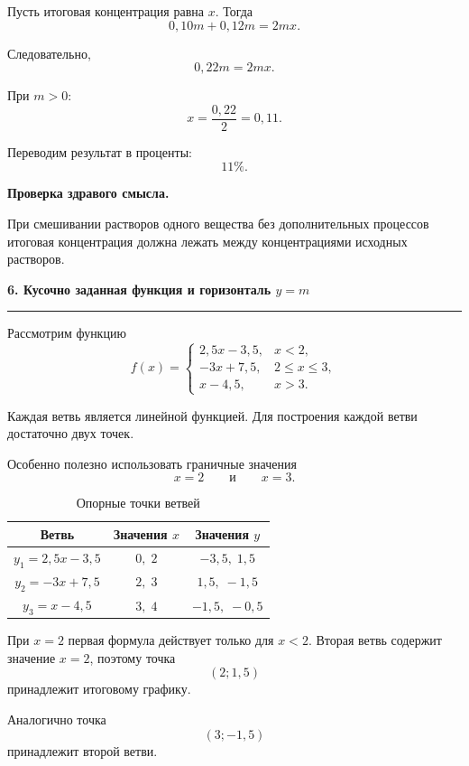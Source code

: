 \documentclass[a4paper,12pt]{article}
\newcommand{\topic}[1]{%
  \vspace{0.8em}%
  {\Large\bfseries\color{darkaccent}#1}\par
  \vspace{0.25em}%
  {\color{accent}\rule{\linewidth}{0.6pt}}\par
  \vspace{0.45em}%
}
\newcommand{\key}[1]{%
  \textbf{\color{darkaccent}#1}%
}
\begin{document}
Пусть итоговая концентрация равна \(x\). Тогда
\[
0{,}10m+0{,}12m=2mx.
\]

Следовательно,
\[
0{,}22m=2mx.
\]

При \(m>0\):
\[
x=\frac{0{,}22}{2}=0{,}11.
\]

Переводим результат в проценты:
\[
\boxed{11\%}.
\]

\key{Проверка здравого смысла.}
При смешивании растворов одного вещества без дополнительных
процессов итоговая концентрация должна лежать между концентрациями
исходных растворов.


\topic{6. Кусочно заданная функция и горизонталь \(y=m\)}

Рассмотрим функцию
\[
f(x)=
\begin{cases}
2{,}5x-3{,}5, & x<2,\\
-3x+7{,}5, & 2\le x\le3,\\
x-4{,}5, & x>3.
\end{cases}
\]

Каждая ветвь является линейной функцией. Для построения каждой ветви
достаточно двух точек.

Особенно полезно использовать граничные значения
\[
x=2
\qquad\text{и}\qquad
x=3.
\]

\begin{table}[ht]
\centering
\caption{Опорные точки ветвей}
\begin{tabular}{@{}ccc@{}}
\toprule
Ветвь & Значения \(x\) & Значения \(y\) \\
\midrule
\(y_1=2{,}5x-3{,}5\)
&
\(0,\;2\)
&
\(-3{,}5,\;1{,}5\)
\\

\(y_2=-3x+7{,}5\)
&
\(2,\;3\)
&
\(1{,}5,\;-1{,}5\)
\\

\(y_3=x-4{,}5\)
&
\(3,\;4\)
&
\(-1{,}5,\;-0{,}5\)
\\
\bottomrule
\end{tabular}
\end{table}

При \(x=2\) первая формула действует только для \(x<2\).
Вторая ветвь содержит значение \(x=2\), поэтому точка
\[
(2;1{,}5)
\]
принадлежит итоговому графику.

Аналогично точка
\[
(3;-1{,}5)
\]
принадлежит второй ветви.
\end{document}
